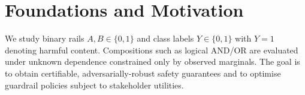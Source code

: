 \section{Foundations and Motivation}
We study binary rails $A,B\in\{0,1\}$ and class labels $Y\in\{0,1\}$ with $Y=1$ denoting harmful
content. Compositions such as logical AND/OR are evaluated under unknown dependence constrained only by
observed marginals. The goal is to obtain certifiable, adversarially-robust safety guarantees and to
optimise guardrail policies subject to stakeholder utilities.

